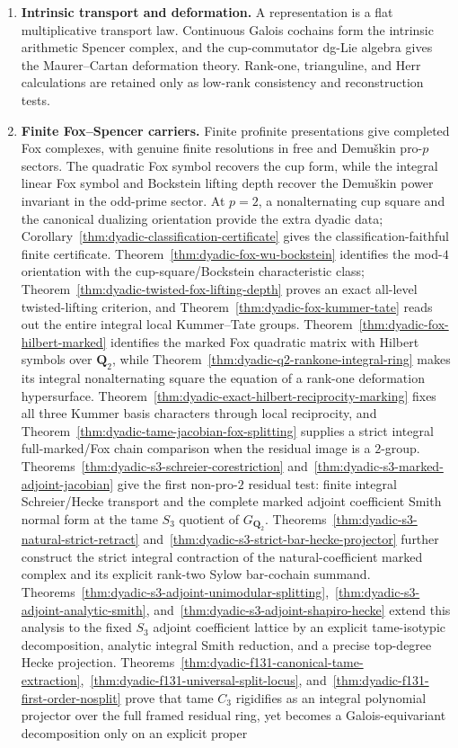 \documentclass[11pt]{article}
\theoremstyle{definition}
\begin{document}
\begin{enumerate}[label=\textbf{(\arabic*)}]
\item \textbf{Intrinsic transport and deformation.}
A representation is a flat multiplicative transport law.  Continuous Galois cochains form the intrinsic arithmetic Spencer complex, and the cup-commutator dg-Lie algebra gives the Maurer--Cartan deformation theory.  Rank-one, trianguline, and Herr calculations are retained only as low-rank consistency and reconstruction tests.

\item \textbf{Finite Fox--Spencer carriers.}
Finite profinite presentations give completed Fox complexes, with genuine finite resolutions in free and Demu\v{s}kin pro-$p$ sectors.  The quadratic Fox symbol recovers the cup form, while the integral linear Fox symbol and Bockstein lifting depth recover the Demu\v{s}kin power invariant in the odd-prime sector.  At $p=2$, a nonalternating cup square and the canonical dualizing orientation provide the extra dyadic data; Corollary~\ref{thm:dyadic-classification-certificate} gives the classification-faithful finite certificate.  Theorem~\ref{thm:dyadic-fox-wu-bockstein} identifies the mod-$4$ orientation with the cup-square/Bockstein characteristic class; Theorem~\ref{thm:dyadic-twisted-fox-lifting-depth} proves an exact all-level twisted-lifting criterion, and Theorem~\ref{thm:dyadic-fox-kummer-tate} reads out the entire integral local Kummer--Tate groups.  Theorem~\ref{thm:dyadic-fox-hilbert-marked} identifies the marked Fox quadratic matrix with Hilbert symbols over $\mathbf Q_2$, while Theorem~\ref{thm:dyadic-q2-rankone-integral-ring} makes its integral nonalternating square the equation of a rank-one deformation hypersurface.  Theorem~\ref{thm:dyadic-exact-hilbert-reciprocity-marking} fixes all three Kummer basis characters through local reciprocity, and Theorem~\ref{thm:dyadic-tame-jacobian-fox-splitting} supplies a strict integral full-marked/Fox chain comparison when the residual image is a $2$-group.  Theorems~\ref{thm:dyadic-s3-schreier-corestriction} and~\ref{thm:dyadic-s3-marked-adjoint-jacobian} give the first non-pro-$2$ residual test: finite integral Schreier/Hecke transport and the complete marked adjoint coefficient Smith normal form at the tame $S_3$ quotient of $G_{\mathbf Q_2}$.  Theorems~\ref{thm:dyadic-s3-natural-strict-retract} and~\ref{thm:dyadic-s3-strict-bar-hecke-projector} further construct the strict integral contraction of the natural-coefficient marked complex and its explicit rank-two Sylow bar-cochain summand.  Theorems~\ref{thm:dyadic-s3-adjoint-unimodular-splitting},~\ref{thm:dyadic-s3-adjoint-analytic-smith}, and~\ref{thm:dyadic-s3-adjoint-shapiro-hecke} extend this analysis to the fixed $S_3$ adjoint coefficient lattice by an explicit tame-isotypic decomposition, analytic integral Smith reduction, and a precise top-degree Hecke projection.  Theorems~\ref{thm:dyadic-f131-canonical-tame-extraction},~\ref{thm:dyadic-f131-universal-split-locus}, and~\ref{thm:dyadic-f131-first-order-nosplit} prove that tame $C_3$ rigidifies as an integral polynomial projector over the full framed residual ring, yet becomes a Galois-equivariant decomposition only on an explicit proper 
\end{enumerate}
\end{document}
